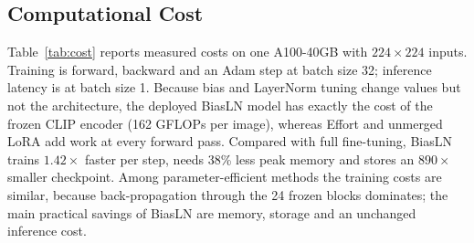 \documentclass[fonts]{icst}
\newif\ifrevmark\revmarktrue
\newcommand{\rev}[1]{\ifrevmark{\color{revblue}#1}\else#1\fi}
\newenvironment{revblock}{\ifrevmark\color{revblue}\fi}{}
\begin{document}
\begin{revblock}
\subsection{Computational Cost}
\label{sec:cost}
Table~\ref{tab:cost} reports measured costs on one A100-40GB with $224\times224$ inputs. Training is forward, backward and an Adam step at batch size 32; inference latency is at batch size 1. Because bias and LayerNorm tuning change values but not the architecture, the deployed BiasLN model has exactly the cost of the frozen CLIP encoder (162 GFLOPs per image), whereas Effort and unmerged LoRA add work at every forward pass. Compared with full fine-tuning, BiasLN trains $1.42\times$ faster per step, needs 38\% less peak memory and stores an $890\times$ smaller checkpoint. Among parameter-efficient methods the training costs are similar, because back-propagation through the 24 frozen blocks dominates; the main practical savings of BiasLN are memory, storage and an unchanged inference cost.
\end{revblock}

\begin{table}[H]
\centering
\captionsetup{labelsep=period, labelfont=bf, hypcap=false}
\caption{\rev{Measured cost on an NVIDIA A100-40GB (fp32, $224\times224$). Train: batch 32, forward + backward + Adam step. Infer: batch 1. Ckpt: size of the stored trainable tensors.}}
\label{tab:cost}
\end{table}
\end{document}
